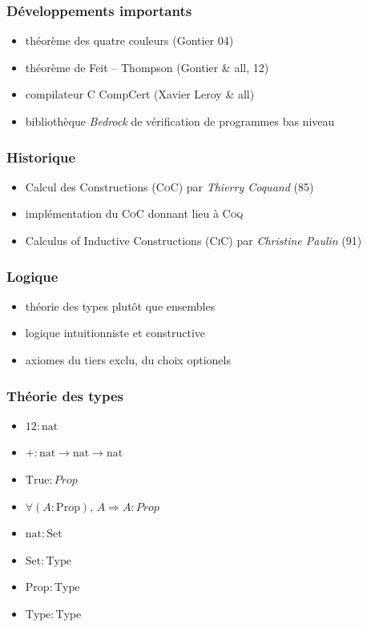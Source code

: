 \documentclass[hyperref={pdfpagelabels=false}]{beamer}
\begin{document}
\begin{frame}
  \frametitle{Développements importants}
  \begin{itemize}
    \item théorème des quatre couleurs (Gontier 04)
    \item théorème de Feit -- Thompson (Gontier \& all, 12)
    \item compilateur \textsc{C} CompCert (Xavier Leroy \& all)
    \item bibliothèque \emph{Bedrock} de vérification de programmes bas niveau
  \end{itemize}
\end{frame}

\begin{frame}
  \frametitle{Historique}
  \begin{itemize}
    \item Calcul des Constructions (\textsc{CoC}) par \emph{Thierry Coquand} (85)
    \item implémentation du \textsc{CoC} donnant lieu à \textsc{Coq}
    \item Calculus of Inductive Constructions (\textsc{CiC}) par \emph{Christine Paulin} (91)
  \end{itemize}
\end{frame}

\begin{frame}
  \frametitle{Logique}
  \begin{itemize}
    \item théorie des types plutôt que ensembles
    \item logique intuitionniste et constructive
    \item axiomes du tiers exclu, du choix optionels
  \end{itemize}
\end{frame}

\begin{frame}
  \frametitle{Théorie des types}
  \begin{itemize}
    \item $12 : \mathrm{nat}$
    \item $+ : \mathrm{nat} \rightarrow \mathrm{nat} \rightarrow \mathrm{nat}$
    \item $\mathrm{True} : Prop$
    \item $\forall (A : \mathrm{Prop}),\, A \Rightarrow A : Prop$
    \item $\mathrm{nat} : \mathrm{Set}$
    \item $\mathrm{Set} : \mathrm{Type}$
    \item $\mathrm{Prop} : \mathrm{Type}$
    \item $\mathrm{Type} : \mathrm{Type}$
  \end{itemize}
\end{frame}
\end{document}

